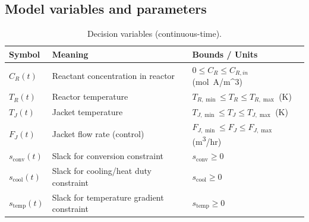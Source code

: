 \documentclass[11pt]{article}
\begin{document}
\subsection{Model variables and parameters}
\begin{table}[H]
\centering
\caption{Decision variables (continuous-time).}
\label{tab:variables}
\begin{tabularx}{\textwidth}{@{}lXl@{}}
\toprule
\textbf{Symbol} & \textbf{Meaning} & \textbf{Bounds / Units}\\
\midrule
$C_R(t)$ & Reactant concentration in reactor & $0 \le C_R \le C_{R,in}$ \;(\si{mol.{A/m^{3}}})\\
$T_R(t)$ & Reactor temperature & $T_{R,\min} \le T_R \le T_{R,\max}$ \;(\si{K})\\
$T_J(t)$ & Jacket temperature & $T_{J,\min} \le T_J \le T_{J,\max}$ \;(\si{K})\\
$F_J(t)$ & Jacket flow rate (control) & $F_{J,\min} \le F_J \le F_{J,\max}$ \;(\si{m^{3}/hr})\\
$s_{\mathrm{conv}}(t)$ & Slack for conversion constraint & $s_{\mathrm{conv}} \ge 0$\\
$s_{\mathrm{cool}}(t)$ & Slack for cooling/heat duty constraint & $s_{\mathrm{cool}} \ge 0$\\
$s_{\mathrm{temp}}(t)$ & Slack for temperature gradient constraint & $s_{\mathrm{temp}} \ge 0$\\[2pt]
\bottomrule
\end{tabularx}
\end{table}
\end{document}
